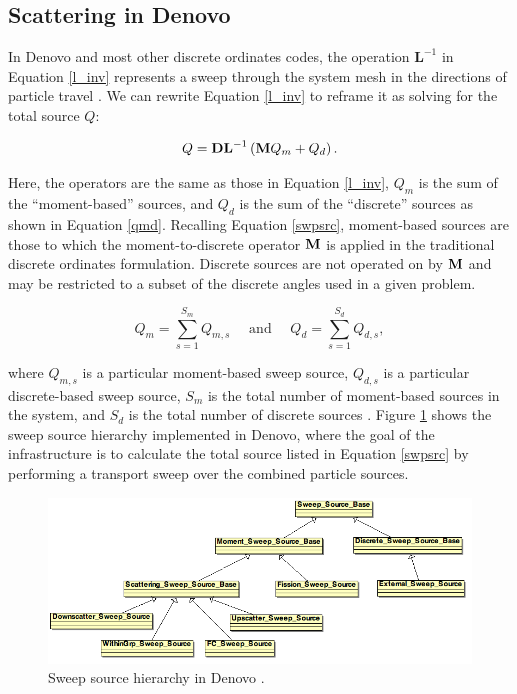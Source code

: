 \FloatBarrier
\subsection{Scattering in Denovo}

In Denovo and most other discrete ordinates codes, the operation $\mathbf{L}^{-1}$ in 
Equation \ref{l_inv} represents a sweep through the system mesh in the directions of 
particle travel \cite{denovo}. 
We can rewrite Equation \ref{l_inv} to reframe it as solving for the total source $Q$:

\begin{equation}
Q = \mathbf{DL}^{-1}\left(\mathbf{M}Q_m + Q_d\right).
\label{swpsrc}
\end{equation}

\noindent Here, the operators are the same as those in Equation \ref{l_inv}, $Q_m$ is 
the sum of the ``moment-based'' sources, and $Q_d$ is the sum of the ``discrete'' 
sources \cite{sweepsources} as shown in Equation \ref{qmd}. Recalling Equation 
\ref{swpsrc}, moment-based sources are those to which the moment-to-discrete operator 
$\mathbf{M}$ is applied in the traditional discrete ordinates formulation. Discrete sources
are not operated on by $\mathbf{M}$ and may be restricted to a subset of the discrete 
angles used in a given problem.

\begin{equation}
Q_m = \sum_{s=1}^{S_m}Q_{m,s} \quad\text{ and }\quad Q_d = \sum_{s=1}^{S_d}Q_{d,s},
\label{qmd}
\end{equation}

\noindent where $Q_{m,s}$ is a particular moment-based sweep source, $Q_{d,s}$ is a
particular discrete-based sweep source, $S_m$ is the total number of moment-based 
sources in the system, and $S_d$ is the total number of discrete sources
\cite{sweepsources}. Figure \ref{swpsrclist} shows the sweep source hierarchy
implemented in Denovo, where the goal of the infrastructure is to calculate the total
source listed in Equation \ref{swpsrc} by performing a transport sweep over the 
combined particle sources.

\begin{figure}[!htb]
\centering
\includegraphics[width=\textwidth]{img/swp-src.png}
\caption{Sweep source hierarchy in Denovo \cite{sweepsources}.}
\label{swpsrclist}
\end{figure}

